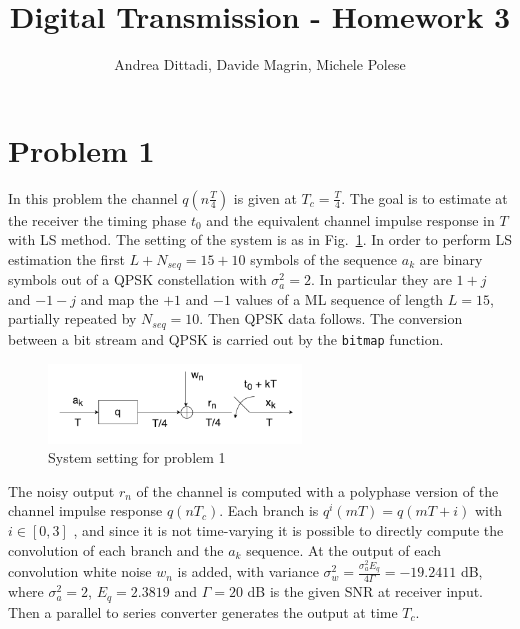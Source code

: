 \documentclass[10pt]{article}
\begin{document}
\title{Digital Transmission - Homework 3}
\author{Andrea Dittadi, Davide Magrin, Michele Polese}

\maketitle


\section*{Problem 1}

In this problem the channel $q(n\frac{T}{4})$ is given at $T_c = \frac{T}{4}$. The goal is to estimate at the receiver the timing phase $t_0$ and the equivalent channel impulse response in $T$ with LS method.
The setting of the system is as in Fig.~\ref{fig:channel_T4}. In order to perform LS estimation the first $L + N_{seq} = 15 + 10$ symbols of the sequence $a_k$ are binary symbols out of a QPSK constellation with $\sigma_a^2 = 2$. 
In particular they are $1+j$ and $-1-j$ and map the $+1$ and $-1$ values of a ML sequence of length $L = 15$, partially repeated by $N_{seq}=10$. Then QPSK data follows. 
The conversion between a bit stream and QPSK is carried out by the \texttt{bitmap} function. %

\begin{figure}
	\centering
	\includegraphics[width = 0.6\textwidth]{channel_T4}
	\caption{System setting for problem 1}
	\label{fig:channel_T4}
\end{figure}


The noisy output $r_n$ of the channel is computed with a polyphase version of the channel impulse response $q(nT_c)$. Each branch is $q^{i}(mT) = q(mT + i)$ with $i \in [0, 3]$ , and since it is not time-varying it is possible to directly compute the convolution of each branch and the $a_k$ sequence. At the output of each convolution white noise $w_n$ is added, with variance $\sigma_w^2 = \frac{\sigma_a^2 E_q}{4 \Gamma} = -19.2411$ dB, where $\sigma_a^2 = 2$, $E_q = 2.3819$ and $\Gamma = 20$ dB is the given SNR at receiver input. Then a parallel to series converter generates the output at time $T_c$.
\end{document}
